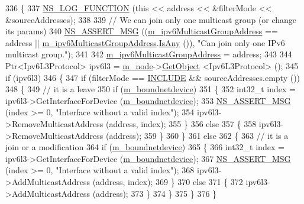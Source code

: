 \begin{DoxyCode}
336 \{
337   \hyperlink{log-macros-disabled_8h_a90b90d5bad1f39cb1b64923ea94c0761}{NS\_LOG\_FUNCTION} (\textcolor{keyword}{this} << address << &filterMode << &sourceAddresses);
338 
339   \textcolor{comment}{// We can join only one multicast group (or change its params)}
340   \hyperlink{assert_8h_aff5ece9066c74e681e74999856f08539}{NS\_ASSERT\_MSG} ((\hyperlink{classns3_1_1Socket_a5745d9cdf891f3f0c06b124c4b679ef9}{m\_ipv6MulticastGroupAddress} == address || 
      \hyperlink{classns3_1_1Socket_a5745d9cdf891f3f0c06b124c4b679ef9}{m\_ipv6MulticastGroupAddress}.\hyperlink{classns3_1_1Ipv6Address_a6f15ff7a41a6ae2171cdeda2a53179b8}{IsAny} ()), \textcolor{stringliteral}{"Can join only one IPv6 multicast
       group."});
341 
342   \hyperlink{classns3_1_1Socket_a5745d9cdf891f3f0c06b124c4b679ef9}{m\_ipv6MulticastGroupAddress} = address;
343 
344   Ptr<Ipv6L3Protocol> ipv6l3 = \hyperlink{classns3_1_1Ipv6RawSocketImpl_a2afa14d1f4c1f729c989c00e3ad350fb}{m\_node}->\hyperlink{classns3_1_1Object_a13e18c00017096c8381eb651d5bd0783}{GetObject} <Ipv6L3Protocol> ();
345   \textcolor{keywordflow}{if} (ipv6l3)
346     \{
347       \textcolor{keywordflow}{if} (filterMode == \hyperlink{classns3_1_1Socket_a96f39fe2b73d5691b319093a1e31615da3518a166d4dda6c74bf8aaaade9edf7a}{INCLUDE} && sourceAddresses.empty ())
348         \{
349           \textcolor{comment}{// it is a leave}
350           \textcolor{keywordflow}{if} (\hyperlink{classns3_1_1Socket_a9781d8dfdb5e9364d5dce8f53b768bb5}{m\_boundnetdevice})
351             \{
352               int32\_t index = ipv6l3->GetInterfaceForDevice (\hyperlink{classns3_1_1Socket_a9781d8dfdb5e9364d5dce8f53b768bb5}{m\_boundnetdevice});
353               \hyperlink{assert_8h_aff5ece9066c74e681e74999856f08539}{NS\_ASSERT\_MSG} (index >= 0, \textcolor{stringliteral}{"Interface without a valid index"});
354               ipv6l3->RemoveMulticastAddress (address, index);
355             \}
356           \textcolor{keywordflow}{else}
357             \{
358               ipv6l3->RemoveMulticastAddress (address);
359             \}
360         \}
361       \textcolor{keywordflow}{else}
362         \{
363           \textcolor{comment}{// it is a join or a modification}
364           \textcolor{keywordflow}{if} (\hyperlink{classns3_1_1Socket_a9781d8dfdb5e9364d5dce8f53b768bb5}{m\_boundnetdevice})
365             \{
366               int32\_t index = ipv6l3->GetInterfaceForDevice (\hyperlink{classns3_1_1Socket_a9781d8dfdb5e9364d5dce8f53b768bb5}{m\_boundnetdevice});
367               \hyperlink{assert_8h_aff5ece9066c74e681e74999856f08539}{NS\_ASSERT\_MSG} (index >= 0, \textcolor{stringliteral}{"Interface without a valid index"});
368               ipv6l3->AddMulticastAddress (address, index);
369             \}
370           \textcolor{keywordflow}{else}
371             \{
372               ipv6l3->AddMulticastAddress (address);
373             \}
374         \}
375     \}
376 \}
\end{DoxyCode}


